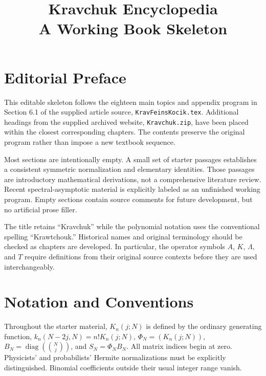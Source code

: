 \documentclass[11pt,oneside]{amsbook}
\title{Kravchuk Encyclopedia\\ A Working Book Skeleton}
\date{}
\theoremstyle{definition}
\theoremstyle{remark}
\begin{document}
\frontmatter
\maketitle
\chapter*{Editorial Preface}
This editable skeleton follows the eighteen main topics and appendix program in Section 6.1 of the supplied article source, \texttt{KravFeinsKocik.tex}. Additional headings from the supplied archived website, \texttt{Kravchuk.zip}, have been placed within the closest corresponding chapters. The contents preserve the original program rather than impose a new textbook sequence.

Most sections are intentionally empty. A small set of starter passages establishes a consistent symmetric normalization and elementary identities. Those passages are introductory mathematical derivations, not a comprehensive literature review. Recent spectral-asymptotic material is explicitly labeled as an unfinished working program. Empty sections contain source comments for future development, but no artificial prose filler.

The title retains ``Kravchuk'' while the polynomial notation uses the conventional spelling ``Krawtchouk.'' Historical names and original terminology should be checked as chapters are developed. In particular, the operator symbols $A$, $K$, $\Lambda$, and $T$ require definitions from their original source contexts before they are used interchangeably.
\chapter*{Notation and Conventions}
Throughout the starter material, $K_n(j;N)$ is defined by the ordinary generating function, $k_n(N-2j,N)=n!K_n(j;N)$, $\Phi_N=(K_n(j;N))$, $B_N=\operatorname{diag}(\binom Nj)$, and $S_N=\Phi_NB_N$. All matrix indices begin at zero. Physicists' and probabilists' Hermite normalizations must be explicitly distinguished. Binomial coefficients outside their usual integer range vanish.
\tableofcontents
\mainmatter


















\appendix






\backmatter
\end{document}
